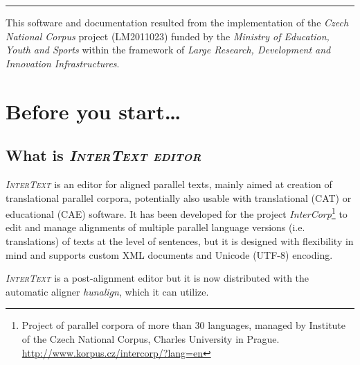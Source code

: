 \documentclass[a4paper,10pt,oneside]{book}
\newcommand{\IT}{\textit{\textsc{InterText}}\xspace}
\newcommand{\ITeditor}{\textit{\textsc{InterText editor}}\xspace}
\begin{document}
\vspace*{18cm}
\begin{flushleft}
\hrule\medskip
This software and documentation resulted from the implementation of the \emph{Czech National Corpus} project (LM2011023) funded by the \emph{Ministry of Education, Youth and Sports} within the framework of \emph{Large Research, Development and Innovation Infrastructures}.
\end{flushleft}


\frontmatter
\tableofcontents
\mainmatter

\part{Before you start\ldots}\label{ch:beforestart}

\chapter{What is \ITeditor}\label{ch:intro:whatis}

\IT is an editor for aligned parallel texts, mainly aimed at creation of translational parallel corpora, potentially also usable with translational (CAT) or educational (CAE) software. It has been developed for the project \emph{InterCorp}\footnote{Project of parallel corpora of more than 30 languages, managed by Institute of the Czech National Corpus, Charles University in Prague. \url{http://www.korpus.cz/intercorp/?lang=en}} to edit and manage alignments of multiple parallel language versions (i.e. translations) of texts at the level of sentences, but it is designed with flexibility in mind and supports custom XML documents and Unicode (UTF-8) encoding.

\IT is a post-alignment editor but it is now distributed with the automatic aligner \emph{hunalign}, which it can utilize.
\end{document}
